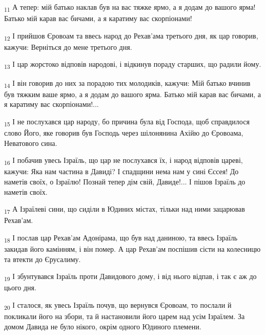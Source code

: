 \begin{tcolorbox}
\textsubscript{11} А тепер: мій батько наклав був на вас тяжке ярмо, а я додам до вашого ярма! Батько мій карав вас бичами, а я каратиму вас скорпіонами!
\end{tcolorbox}
\begin{tcolorbox}
\textsubscript{12} І прийшов Єровоам та ввесь народ до Рехав'ама третього дня, як цар говорив, кажучи: Верніться до мене третього дня.
\end{tcolorbox}
\begin{tcolorbox}
\textsubscript{13} І цар жорстоко відповів народові, і відкинув пораду старших, що радили йому.
\end{tcolorbox}
\begin{tcolorbox}
\textsubscript{14} І він говорив до них за порадою тих молодиків, кажучи: Мій батько вчинив був тяжким ваше ярмо, а я додам до вашого ярма. Батько мій карав вас бичами, а я каратиму вас скорпіонами!...
\end{tcolorbox}
\begin{tcolorbox}
\textsubscript{15} І не послухався цар народу, бо причина була від Господа, щоб справдилося слово Його, яке говорив був Господь через шілонянина Ахійю до Єровоама, Неватового сина.
\end{tcolorbox}
\begin{tcolorbox}
\textsubscript{16} І побачив увесь Ізраїль, що цар не послухався їх, і народ відповів цареві, кажучи: Яка нам частина в Давиді? І спадщини нема нам у сині Єссея! До наметів своїх, о Ізраїлю! Познай тепер дім свій, Давиде!... І пішов Ізраїль до наметів своїх.
\end{tcolorbox}
\begin{tcolorbox}
\textsubscript{17} А Ізраїлеві сини, що сиділи в Юдиних містах, тільки над ними зацарював Рехав'ам.
\end{tcolorbox}
\begin{tcolorbox}
\textsubscript{18} І послав цар Рехав'ам Адонірама, що був над даниною, та ввесь Ізраїль закидав його камінням, і він помер. А цар Рехав'ам поспішив сісти на колесницю та втекти до Єрусалиму.
\end{tcolorbox}
\begin{tcolorbox}
\textsubscript{19} І збунтувався Ізраїль проти Давидового дому, і від нього відпав, і так є аж до цього дня.
\end{tcolorbox}
\begin{tcolorbox}
\textsubscript{20} І сталося, як увесь Ізраїль почув, що вернувся Єровоам, то послали й покликали його на збори, та й настановили його царем над усім Ізраїлем. За домом Давида не було нікого, окрім одного Юдиного племени.
\end{tcolorbox}
